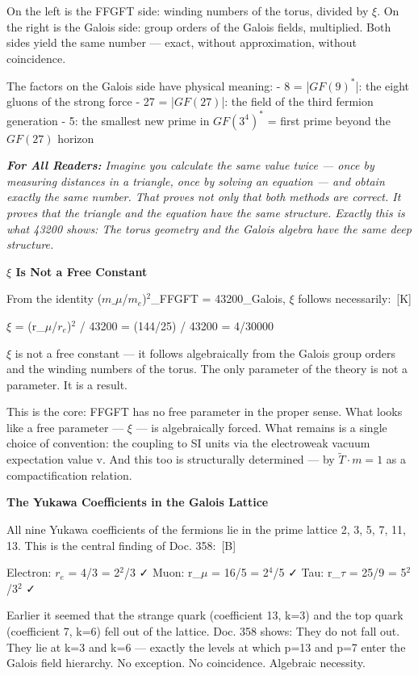 \documentclass[11pt,oneside]{book}
\newcommand{\status}[1]{\penalty10000\,{\scriptsize\textcolor{gray!60}{[#1]}}}
\newenvironment{laierspur}{%
  \par\vspace{4pt}%
  \noindent\small\itshape\color{blue!60!black}%
  \textbf{For All Readers:}\enspace\ignorespaces}{%
  \par\vspace{4pt}\normalsize\normalfont\normalcolor}
\begin{document}
On the left is the FFGFT side: winding numbers of the torus, divided by $\xi$.
On the right is the Galois side: group orders of the Galois fields,
multiplied. Both sides yield the same number — exact, without approximation,
without coincidence.

The factors on the Galois side have physical meaning:
- 8 = |$GF(9)^*$|: the eight gluons of the strong force
- 27 = |$GF(27)$|: the field of the third fermion generation
- 5: the smallest new prime in $GF(3^4)^*$ = first prime beyond the
  $GF(27)$ horizon

\begin{laierspur}
Imagine you calculate the same value twice — once by measuring distances
in a triangle, once by solving an equation — and obtain exactly the same
number. That proves not only that both methods are correct. It proves that
the triangle and the equation have the same structure. Exactly this is what
43200 shows: The torus geometry and the Galois algebra have the same deep
structure.
\end{laierspur}

\textbf{$\xi$ Is Not a Free Constant}

From the identity ($m\_\mu$/$m_e$)$^2$\_FFGFT = 43200\_Galois, $\xi$ follows necessarily: \status{K}

$\xi$ = (r\_$\mu$/$r_e$)$^2$ / 43200 = (144/25) / 43200 = 4/30000

$\xi$ is not a free constant — it follows algebraically from the Galois group
orders and the winding numbers of the torus. The only parameter of the
theory is not a parameter. It is a result.

This is the core: FFGFT has no free parameter in the proper sense. What looks
like a free parameter — $\xi$ — is algebraically forced. What remains is a
single choice of convention: the coupling to SI units via the electroweak
vacuum expectation value v. And this too is structurally determined — by
$\tilde{T}\cdot m = 1$ as a compactification relation.

\textbf{The Yukawa Coefficients in the Galois Lattice}

All nine Yukawa coefficients of the fermions lie in the prime lattice
{2, 3, 5, 7, 11, 13}. This is the central finding of Doc. 358: \status{B}

Electron: $r_e$ = 4/3 = 2$^2$/3 ✓
Muon: r\_$\mu$ = 16/5 = 2$^4$/5 ✓
Tau: r\_$\tau$ = 25/9 = 5$^2$/3$^2$ ✓

Earlier it seemed that the strange quark (coefficient 13, k=3) and the top
quark (coefficient 7, k=6) fell out of the lattice. Doc. 358 shows: They do
not fall out. They lie at k=3 and k=6 — exactly the levels at which p=13 and
p=7 enter the Galois field hierarchy. No exception. No coincidence.
Algebraic necessity.
\end{document}
